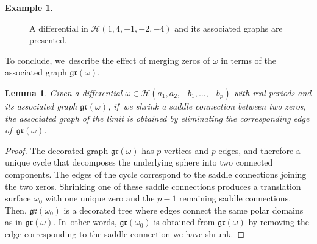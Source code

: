 \documentclass[11pt]{article}
\newtheorem{lem}[thm]{Lemma}
\theoremstyle{definition}
\newtheorem{ex}[thm]{Example}
\begin{document}
\begin{ex}
\begin{figure}[ht]
\caption{A differential in $\mathcal{H}(1,4,-1,-2,-4)$ and its associated graphs are presented.} \label{fig:exgraph2}
\end{figure}
\end{ex}

To conclude, we~describe the effect of merging zeros of $\omega$ in terms of the associated graph $\mathfrak{gr}(\omega)$.
\begin{lem}\label{lem:defengraph}
Given a differential $\omega\in\mathcal{H}(a_{1},a_{2},-b_{1},\dots,-b_{p})$ with real periods and its associated graph $\mathfrak{gr}(\omega)$, if~we shrink a saddle connection between two zeros, the associated graph of the limit is obtained by eliminating the corresponding edge of~$\mathfrak{gr}(\omega)$.
\end{lem}

\begin{proof}
The decorated graph $\mathfrak{gr}(\omega)$ has $p$ vertices and $p$ edges, and therefore a unique cycle that decomposes the underlying sphere into two connected components. The edges of the cycle correspond to the saddle connections joining the two zeros. Shrinking one of these saddle connections produces a translation surface $\omega_{0}$ with one unique zero and the $p-1$ remaining saddle connections. Then, $\mathfrak{gr}(\omega_{0})$ is a decorated tree where edges connect the same polar domains as in $\mathfrak{gr}(\omega)$. In~other words, $\mathfrak{gr}(\omega_{0})$ is obtained from $\mathfrak{gr}(\omega)$ by removing the edge corresponding to the saddle connection we have shrunk.
\end{proof}
\end{document}

